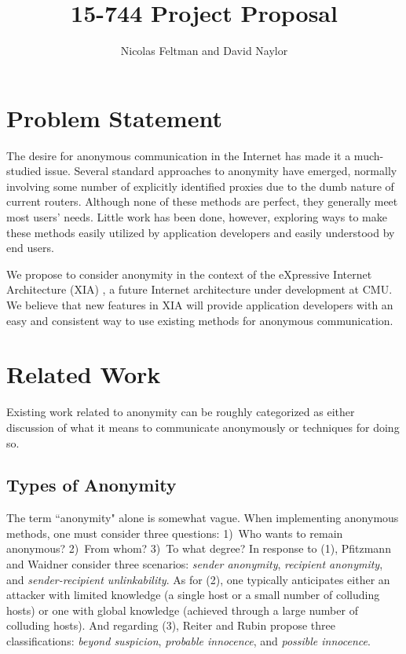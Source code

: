 \documentclass[11pt]{article}
\title{15-744 Project Proposal}
\author{Nicolas Feltman and David Naylor}
\date{}
\begin{document}
\maketitle

\section{Problem Statement}
The desire for anonymous communication in the Internet has made it a much-studied issue. Several standard approaches to anonymity have emerged, normally involving some number of explicitly identified proxies  due to the dumb nature of current routers. Although none of these methods are perfect, they generally meet most users' needs. Little work has been done, however, exploring ways to make these methods easily utilized by application developers and easily understood by end users.

We propose to consider anonymity in the context of the eXpressive Internet Architecture (XIA) \cite{xia}, a future Internet architecture under development at CMU. We believe that new features in XIA will provide application developers with an easy and consistent way to use existing methods for anonymous communication.


\section{Related Work}
Existing work related to anonymity can be roughly categorized as either discussion of what it means to communicate anonymously or techniques for doing so.

\subsection{Types of Anonymity}
The term ``anonymity" alone is somewhat vague.  When implementing anonymous methods, one must consider three questions: 1)~Who wants to remain anonymous? 2)~From whom? 3)~To what degree? In response to (1), Pfitzmann and Waidner \cite{PW87} consider three scenarios: \emph{sender anonymity}, \emph{recipient anonymity}, and \emph{sender-recipient unlinkability}. As for (2), one typically anticipates either an attacker with limited knowledge (a single host or a small number of colluding hosts) or one with global knowledge (achieved through a large number of colluding hosts). And regarding (3), Reiter and Rubin \cite{RR98} propose three classifications: \emph{beyond suspicion}, \emph{probable innocence}, and \emph{possible innocence}.
\end{document}
